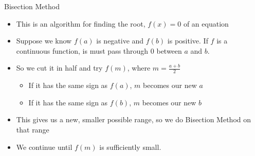 {}\documentclass[letterpaper,
compress,
xcolor=x11names,
]{beamer}
\begin{document}
\begin{frame}{Bisection Method}
	\footnotesize
	\begin{itemize}
		\item This is an algorithm for finding the root, $f(x) = 0$ of an equation
		\item Suppose we know $f(a)$ is negative and $f(b)$ is positive. If $f$ is a continuous function, is must pass through 0 between $a$ and $b$.
		\item<2-> So we cut it in half and try $f(m)$, where $m  =\frac{a+b}{2}$
		\begin{itemize}
			\item<3-> If it has the same sign as $f(a)$, $m$ becomes our new $a$
			\item<3-> If it has the same sign as $f(b)$, $m$ becomes our new $b$
		\end{itemize} 
		\item<4-> This gives us a new, smaller possible range, so we do Bisection Method on that range
		\item<4-> We continue until $f(m)$ is sufficiently small.
	\end{itemize}
	\begin{center}
	\end{center}
\end{frame}

\end{document}
